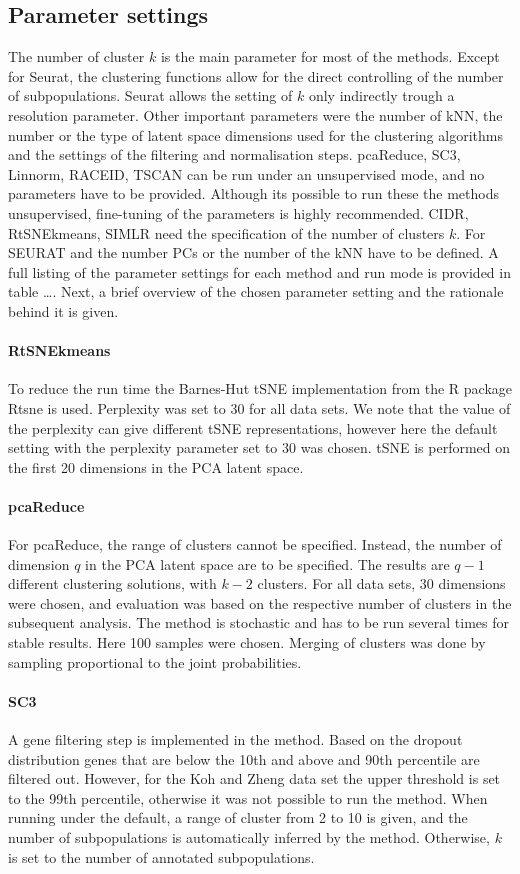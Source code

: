 \documentclass[11pt, a4paper]{article}\usepackage[]{graphicx}\usepackage[]{color}
\begin{document}
\subsection{Parameter settings}
The number of cluster $k$ is the main parameter for most of the methods. Except for Seurat, the clustering functions allow for the direct controlling of the number of subpopulations.  Seurat allows the setting of $k$ only indirectly trough a resolution parameter. 
Other important parameters were the number of kNN, the number or the type of latent space dimensions used for the clustering algorithms and the settings of the filtering and normalisation steps. pcaReduce, SC3, Linnorm, RACEID, TSCAN can be run under an unsupervised mode, and no parameters have to be provided. Although its possible to run these the methods unsupervised, fine-tuning of the parameters is highly recommended. CIDR, RtSNEkmeans, SIMLR need the specification of the number of clusters $k$.
For SEURAT and the number PCs or the number of the kNN have to be defined. 
A full listing of the parameter settings for each method and run mode is provided in table \ldots.
Next, a brief overview of the chosen parameter setting and the rationale behind it is given.
\paragraph{RtSNEkmeans}
To reduce the run time the Barnes-Hut tSNE implementation from the R package Rtsne is used. Perplexity was set to 30 for all data sets. We note that the value of the perplexity can give different tSNE representations, however here the default setting with the perplexity parameter set to 30 was chosen. tSNE is performed on the first 20 dimensions in the PCA latent space. 
\paragraph{pcaReduce}
For pcaReduce, the range of clusters cannot be specified. Instead, the number of dimension $q$ in the PCA latent space are to be specified. The results are $q-1$ different clustering solutions, with $k-2$ clusters. For all data sets, 30 dimensions were chosen, and evaluation was based on the respective number of clusters in the subsequent analysis. The method is stochastic and has to be run several times for stable results. Here 100 samples were chosen. Merging of clusters was done by sampling proportional to the joint probabilities. 
\paragraph{SC3}
A gene filtering step is implemented in the method. Based on the dropout distribution genes that are below the 10th and above and 90th percentile are filtered out. However, for the Koh and Zheng data set the upper threshold is set to the 99th percentile, otherwise it was not possible to run the method.
When running under the default, a range of cluster from 2 to 10 is given, and the number of subpopulations is automatically inferred by the method. Otherwise, $k$ is set to the number of annotated subpopulations. 
\end{document}
